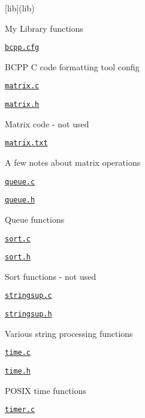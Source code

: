 \begin{DoxyItemize}
\item \mbox{[}lib\mbox{]}(lib)
\begin{DoxyItemize}
\item My Library functions
\item \href{lib/bcpp.cfg}{\tt bcpp.\+cfg}
\begin{DoxyItemize}
\item B\+C\+PP C code formatting tool config
\end{DoxyItemize}
\item \href{lib/matrix.c}{\tt matrix.\+c}
\item \href{lib/matrix.h}{\tt matrix.\+h}
\begin{DoxyItemize}
\item Matrix code -\/ not used
\end{DoxyItemize}
\item \href{lib/matrix.txt}{\tt matrix.\+txt}
\begin{DoxyItemize}
\item A few notes about matrix operations
\end{DoxyItemize}
\item \href{lib/queue.c}{\tt queue.\+c}
\item \href{lib/queue.h}{\tt queue.\+h}
\begin{DoxyItemize}
\item Queue functions
\end{DoxyItemize}
\item \href{lib/sort.c}{\tt sort.\+c}
\item \href{lib/sort.h}{\tt sort.\+h}
\begin{DoxyItemize}
\item Sort functions -\/ not used
\end{DoxyItemize}
\item \href{lib/stringsup.c}{\tt stringsup.\+c}
\item \href{lib/stringsup.h}{\tt stringsup.\+h}
\begin{DoxyItemize}
\item Various string processing functions
\end{DoxyItemize}
\item \href{lib/time.c}{\tt time.\+c}
\item \href{lib/time.h}{\tt time.\+h}
\begin{DoxyItemize}
\item P\+O\+S\+IX time functions
\end{DoxyItemize}
\item \href{lib/timer.c}{\tt timer.\+c}

\end{DoxyItemize}
\end{DoxyItemize}
